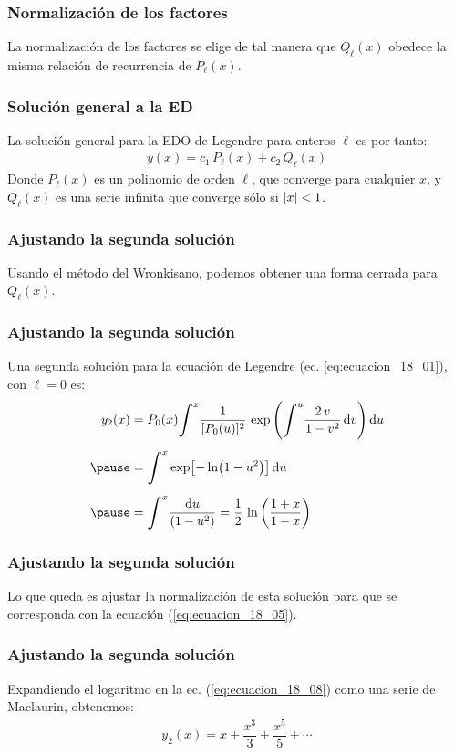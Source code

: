\documentclass[12pt]{beamer}
\begin{document}
\begin{frame}
\frametitle{Normalización de los factores}
La normalización de los factores se elige de tal manera que $Q_{\ell} (x)$ obedece la misma relación de recurrencia de $P_{\ell} (x)$.
\end{frame}
\begin{frame}
\frametitle{Solución general a la ED}
La solución general para la EDO de Legendre para enteros $\ell$ es por tanto:
\pause
\begin{align}
y(x) = c_{1} \, P_{\ell} (x) + c_{2} \, Q_{\ell} (x) 
\label{eq:ecuacion_18_07}
\end{align}
Donde $P_{\ell} (x)$ es un polinomio de orden $\ell$, que converge para cualquier $x$, y $Q_{\ell} (x)$ es una serie infinita que converge sólo si $\abs{x} < 1$.
\end{frame}
\begin{frame}
\frametitle{Ajustando la segunda solución}
Usando el método del Wronkisano, podemos obtener una forma cerrada para $Q_{\ell} (x)$.
\end{frame}
\begin{frame}
\frametitle{Ajustando la segunda solución}
Una segunda solución para la ecuación de Legendre (ec. \ref{eq:ecuacion_18_01}), con $\ell = 0$ es:
\pause
\begin{eqnarray}
\begin{aligned}[b]
y_{2} (x) &= P_{0} (x) \scaleint{6ex}^{x} \dfrac{1}{[P_{0} (u)]^{2}} \, \exp \left( \scaleint{6ex}^{u} \dfrac{2 \, v}{1 - v^{2}} \dd{v} \right) \dd{u} \\[0.5em] \pause
&= \scaleint{6ex}^{x} \exp [ - \ln (1 - u^{2}) ] \dd{u} \\[0.5em] \pause
&= \scaleint{6ex}^{x} \dfrac{\dd{u}}{(1 - u^{2})} = \dfrac{1}{2} \, \ln \left( \dfrac{1 + x}{1 - x} \right)
\end{aligned}
\label{eq:ecuacion_18_08}
\end{eqnarray}
\end{frame}
\begin{frame}
\frametitle{Ajustando la segunda solución}
Lo que queda es ajustar la normalización de esta solución para que se corresponda con la ecuación (\ref{eq:ecuacion_18_05}).
\end{frame}
\begin{frame}
\frametitle{Ajustando la segunda solución}
Expandiendo el logaritmo en la ec. (\ref{eq:ecuacion_18_08}) como una serie de Maclaurin, obtenemos:
\pause
\begin{align*}
y_{2}(x) = x + \dfrac{x^{3}}{3} + \dfrac{x^{5}}{5} + \cdots
\end{align*}
\end{frame}
\end{document}
